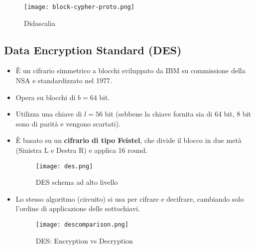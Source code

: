 \documentclass[../main.tex]{subfiles}
\begin{document}
\begin{figure}[H]
	\centering
	\texttt{[image: block-cypher-proto.png]}
	\caption{Didascalia}
	\label{fig:etichetta}
\end{figure}

\subsection{Data Encryption Standard (DES)}
\begin{itemize}
	\item È un cifrario simmetrico a blocchi sviluppato da IBM su commissione della NSA e standardizzato nel 1977.
	\item Opera su blocchi di $b=64$ bit.
	\item Utilizza una chiave di $l=56$ bit (sebbene la chiave fornita sia di 64 bit, 8 bit sono di parità e vengono scartati).
	\item È basato su un \textbf{cifrario di tipo Feistel}, che divide il blocco in due metà (Sinistra L e Destra R) e applica 16 round.
	          
	      \begin{figure}[H]
	      	\centering
	      	\texttt{[image: des.png]}
	      	\caption{DES schema ad alto livello}
	      	\label{fig:etichetta}
	      \end{figure}
	          
	          
	\item Lo stesso algoritmo (circuito) si usa per cifrare e decifrare, cambiando solo l'ordine di applicazione delle sottochiavi.
	          
	      \begin{figure}[H]
	      	\centering
	      	\texttt{[image: descomparison.png]}
	      	\caption{DES: Encryption vs Decryption}
	      	\label{fig:etichetta}
	      \end{figure}
	          

\end{itemize}
\end{document}
